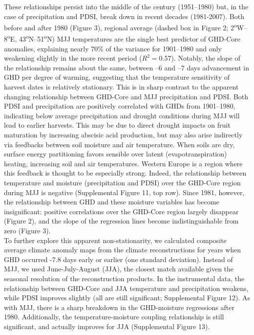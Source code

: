 \documentclass[final]{nature}
\begin{document}
\indent These relationships persist into the middle of the century (1951--1980) but, in the case of precipitation and PDSI, break down in recent decades (1981-2007). Both before and after 1980 (Figure 3), regional average (dashed box in Figure 2; 2\textsuperscript{o}W--8\textsuperscript{o}E, 43\textsuperscript{o}N--51\textsuperscript{o}N) MJJ temperatures are the single best predictor of GHD-Core anomalies, explaining nearly 70\% of the variance for 1901--1980 and only weakening slightly in the more recent period ($R^2=0.57$). Notably, the slope of the relationship remains about the same, between --6 and --7 days advancement in GHD per degree of warming, suggesting that the temperature sensitivity of harvest dates is relatively stationary. This is in sharp contrast to the apparent changing relationship between GHD-Core and MJJ precipitation and PDSI. Both PDSI and precipitation are positively correlated with GHDs from 1901--1980, indicating below average precipitation and drought conditions during MJJ will lead to earlier harvests. This may be due to direct drought impacts on fruit maturation by increasing abscisic acid production\cite{webb2012}, but may also arise indirectly via feedbacks between soil moisture and air temperature. When soils are dry, surface energy partitioning favors sensible over latent (evapotranspiration) heating, increasing soil and air temperatures. Western Europe is a region where this feedback is thought to be especially strong\cite{Seneviratne2006}. Indeed, the relationship between temperature and moisture (precipitation and PDSI) over the GHD-Core region during MJJ is negative (Supplemental Figure 11, top row). Since 1981, however, the relationship between GHD and these moisture variables has become insignificant: positive correlations over the GHD-Core region largely disappear (Figure 2), and the slope of the regression lines become indistinguishable from zero (Figure 3).\\
\indent To further explore this apparent non-stationarity, we calculated composite average climate anomaly maps from the climate reconstructions for years when GHD occurred -7.8 days early or earlier (one standard deviation). Instead of MJJ, we used June-July-August (JJA), the closest match available given the seasonal resolution of the reconstruction products. In the instrumental data, the relationship between GHD-Core and JJA temperature and precipitation weakens, while PDSI improves slightly (all are still significant; Supplemental Figure 12). As with MJJ, there is a sharp breakdown in the GHD-moisture regressions after 1980. Additionally, the temperature-moisture coupling relationship is still significant, and actually improves for JJA (Supplemental Figure 13).\\
\end{document}
